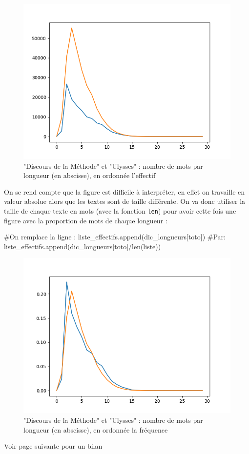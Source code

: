 \begin{figure}
\begin{center}
\includegraphics[width=.5\textwidth]{images/TD1_effectifs_total.png}
\caption{"Discours de la Méthode" et "Ulysses" : nombre de mots par longueur (en abscisse), en ordonnée l'effectif}
\end{center}
\end{figure}

On se rend compte que la figure est difficile à interpréter, en effet on travaille en valeur absolue alors que les textes sont de taille différente. On va donc utiliser la taille de chaque texte en mots (avec la fonction \texttt{len}) pour  avoir cette fois une figure avec la proportion de mots de chaque longueur :

\newpage

\begin{python}
#On remplace la ligne :
      liste_effectifs.append(dic_longueurs[toto])
#Par:
      liste_effectifs.append(dic_longueurs[toto]/len(liste))
\end{python}

\begin{figure}
\begin{center}
\includegraphics[width=.5\textwidth]{images/TD1_frequences_total.png}
\caption{"Discours de la Méthode" et "Ulysses" : nombre de mots par longueur (en abscisse), en ordonnée la fréquence}
\end{center}
\end{figure}

Voir page suivante pour un bilan

